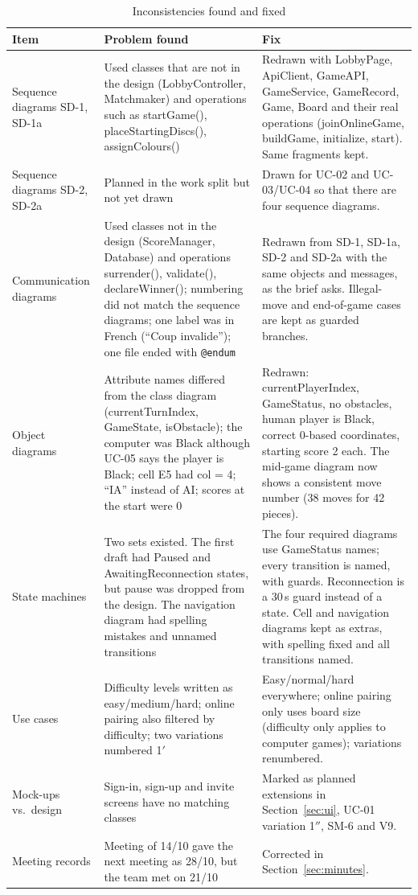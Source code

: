 \documentclass[11pt,a4paper]{article}
\begin{document}
\small
\begin{longtable}{>{\raggedright\arraybackslash}p{2.6cm} >{\raggedright\arraybackslash}p{6.0cm} >{\raggedright\arraybackslash}p{6.4cm}}
\caption{Inconsistencies found and fixed}\label{tab:review}\\
\toprule
\textbf{Item} & \textbf{Problem found} & \textbf{Fix}\\ \midrule\endhead
Sequence diagrams SD-1, SD-1a & Used classes that are not in the design (LobbyController, Matchmaker) and operations such as startGame(), placeStartingDiscs(), assignColours() & Redrawn with LobbyPage, ApiClient, GameAPI, GameService, GameRecord, Game, Board and their real operations (joinOnlineGame, buildGame, initialize, start). Same fragments kept.\\
Sequence diagrams SD-2, SD-2a & Planned in the work split but not yet drawn & Drawn for UC-02 and UC-03/UC-04 so that there are four sequence diagrams.\\
Communication diagrams & Used classes not in the design (ScoreManager, Database) and operations surrender(), validate(), declareWinner(); numbering did not match the sequence diagrams; one label was in French (``Coup invalide''); one file ended with \texttt{@endum} & Redrawn from SD-1, SD-1a, SD-2 and SD-2a with the same objects and messages, as the brief asks. Illegal-move and end-of-game cases are kept as guarded branches.\\
Object diagrams & Attribute names differed from the class diagram (currentTurnIndex, GameState, isObstacle); the computer was Black although UC-05 says the player is Black; cell E5 had col = 4; ``IA'' instead of AI; scores at the start were 0 & Redrawn: currentPlayerIndex, GameStatus, no obstacles, human player is Black, correct 0-based coordinates, starting score 2 each. The mid-game diagram now shows a consistent move number (38 moves for 42 pieces).\\
State machines & Two sets existed. The first draft had Paused and AwaitingReconnection states, but pause was dropped from the design. The navigation diagram had spelling mistakes and unnamed transitions & The four required diagrams use GameStatus names; every transition is named, with guards. Reconnection is a 30\,s guard instead of a state. Cell and navigation diagrams kept as extras, with spelling fixed and all transitions named.\\
Use cases & Difficulty levels written as easy/medium/hard; online pairing also filtered by difficulty; two variations numbered 1$'$ & Easy/normal/hard everywhere; online pairing only uses board size (difficulty only applies to computer games); variations renumbered.\\
Mock-ups vs.\ design & Sign-in, sign-up and invite screens have no matching classes & Marked as planned extensions in Section~\ref{sec:ui}, UC-01 variation 1$''$, SM-6 and V9.\\
Meeting records & Meeting of 14/10 gave the next meeting as 28/10, but the team met on 21/10 & Corrected in Section~\ref{sec:minutes}.\\
\bottomrule
\end{longtable}
\normalsize
\end{document}
